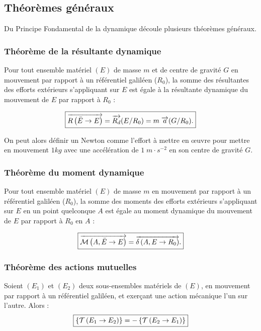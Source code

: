 \documentclass[10pt,fleqn]{article} %
\begin{document}
\subsection{Théorèmes généraux}

Du Principe Fondamental de la dynamique découle plusieurs théorèmes généraux.
\subsubsection{Théorème de la résultante dynamique}

		\begin{theorem}
			Pour tout ensemble matériel $(E)$ de masse $m$ et de centre de gravité $G$ en mouvement par rapport à un référentiel galiléen ($R_0$), la somme des résultantes des efforts extérieurs s'appliquant sur $E$ est égale à la résultante dynamique du mouvement de $E$ par rapport à $R_0$ :
			
			\begin{align}
			\boxed{
				\overrightarrow{R\left( {\bar E} \rightarrow {E}\right)}=\overrightarrow{R_d}(E/R_0)=m\;\overrightarrow{a}(G/R_0).
			}			
			\end{align}
		\end{theorem}


\begin{rem}
On peut alors définir un Newton comme l'effort à mettre en \oe{}uvre pour mettre en mouvement $1kg$ avec une accélération de $1\;m\cdot s^{-2}$ en son centre de gravité $G$.
\end{rem}
\subsubsection{Théorème du moment dynamique}
\begin{theorem}
			Pour tout ensemble matériel $(E)$ de masse $m$ en mouvement par rapport à un référentiel galiléen ($R_0$), la somme des moments des efforts extérieurs s'appliquant sur $E$ en un point quelconque $A$ est égale au moment dynamique du mouvement de $E$ par rapport à $R_0$ en $A$ :
			
			\begin{align}
			\boxed{
				\overrightarrow{\mathcal{M}\left( {A}, {\bar E} \rightarrow {E}\right)}=\overrightarrow{\delta \left( {A}, {E} \rightarrow {R_0}\right)}.
			}			
			\end{align}
		\end{theorem}

\subsubsection{Théorème des actions mutuelles}
\begin{theorem}
			Soient $(E_1)$ et $(E_2)$ deux sous-ensembles matériels de $(E)$,
			en mouvement par rapport à un référentiel galiléen, et exerçant une action mécanique l'un sur l'autre.
			Alors :
			\begin{align}
			\boxed{
				\left\{\mathcal{T} \left(E_1\rightarrow E_2 \right) \right\}=-\left\{\mathcal{T} \left(E_2\rightarrow E_1 \right) \right\}
				}
			\end{align}
		\end{theorem}
		
\end{document}
